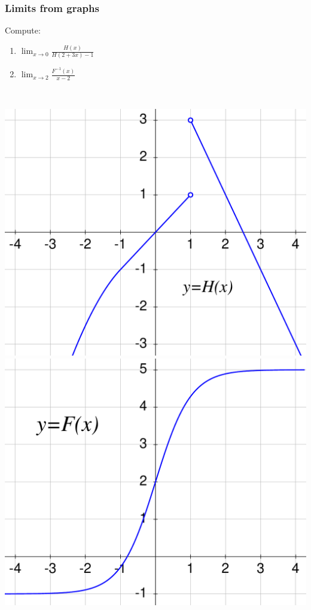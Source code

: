 \documentclass[14pt]{beamer}
\newcommand {\DS} [1] {${\displaystyle #1}$}
\begin{document}
\begin{frame}[t]
\frametitle{Limits from graphs}

Compute:

\begin{multicols}{2}
\begin{enumerate}
	\item  \DS{\lim_{x\to 0 }  \frac{H(x)}{H(2+3x) - 1} }
	\item \DS{\lim_{x \to 2} \frac{F^{-1}(x)}{x-2}}
\end{enumerate}
\end{multicols}

\

\includegraphics[scale=.29]{G14} \hfill
\includegraphics[scale=.29]{G15}

\end{frame}
\end{document}
